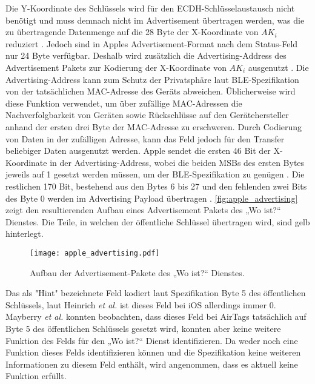 Die Y-Koordinate des Schlüssels wird für den \ac{ECDH}-Schlüsselaustausch nicht benötigt und muss demnach nicht im Advertisement übertragen werden, was die zu übertragende Datenmenge auf die 28 Byte der X-Koordinate von $AK_i$ reduziert \cite{Heinrich_FindMy}.
Jedoch sind in Apples Advertisement-Format nach dem Status-Feld nur 24 Byte verfügbar.
Deshalb  wird zusätzlich die Advertising-Address des Advertisement Pakets zur Kodierung der X-Koordinate von $AK_i$ ausgenutzt \cite{Heinrich_FindMy}.
Die Advertising-Address kann zum Schutz der Privatsphäre laut \ac{BLE}-Spezifikation \cite{Spec_BLE_5.3} von der tatsächlichen \ac{MAC}-Adresse des Geräts abweichen.
Üblicherweise wird diese Funktion verwendet, um über zufällige \ac{MAC}-Adressen die Nachverfolgbarkeit von Geräten sowie Rückschlüsse auf den Gerätehersteller anhand der ersten drei Byte der \ac{MAC}-Adresse zu erschweren.
Durch Codierung von Daten in der zufälligen Adresse, kann das Feld jedoch für den Transfer beliebiger Daten ausgenutzt werden.
Apple sendet die ersten 46 Bit der X-Koordinate in der Advertising-Address, wobei die beiden \acp{MSB} des ersten Bytes jeweils auf 1 gesetzt werden müssen, um der \ac{BLE}-Spezifikation zu genügen \cite{Heinrich_FindMy}.
Die restlichen 170 Bit, bestehend aus den Bytes 6 bis 27 und den fehlenden zwei Bits des Byte 0 werden im Advertising Payload übertragen \cite{Apple_FindMySpec,Heinrich_FindMy}.
\autoref{fig:apple_advertising} zeigt den resultierenden Aufbau eines Advertisement Pakets des „Wo ist?“ Dienstes.
Die Teile, in welchen der öffentliche Schlüssel übertragen wird, sind gelb hinterlegt.
\begin{figure}[ht]
    \centering
    \texttt{[image: apple\_advertising.pdf]}
    \caption{Aufbau der Advertisement-Pakete des „Wo ist?“ Dienstes.}
    \label{fig:apple_advertising}
\end{figure}
Das als "Hint" bezeichnete Feld kodiert laut Spezifikation \cite{Apple_FindMySpec} Byte 5 des öffentlichen Schlüssels, laut Heinrich \textit{et al.} \cite{Heinrich_FindMy} ist dieses Feld bei iOS allerdings immer 0.
Mayberry \textit{et al.} \cite{Mayberry_Tracking} konnten beobachten, dass dieses Feld bei AirTags tatsächlich auf Byte 5 des öffentlichen Schlüssels gesetzt wird, konnten aber keine weitere Funktion des Felds für den „Wo ist?“ Dienst identifizieren.
Da weder \cite{Heinrich_FindMy} noch \cite{Mayberry_Tracking} eine Funktion dieses Felds identifizieren können und die Spezifikation \cite{Apple_FindMySpec} keine weiteren Informationen zu diesem Feld enthält, wird angenommen, dass es aktuell keine Funktion erfüllt.

